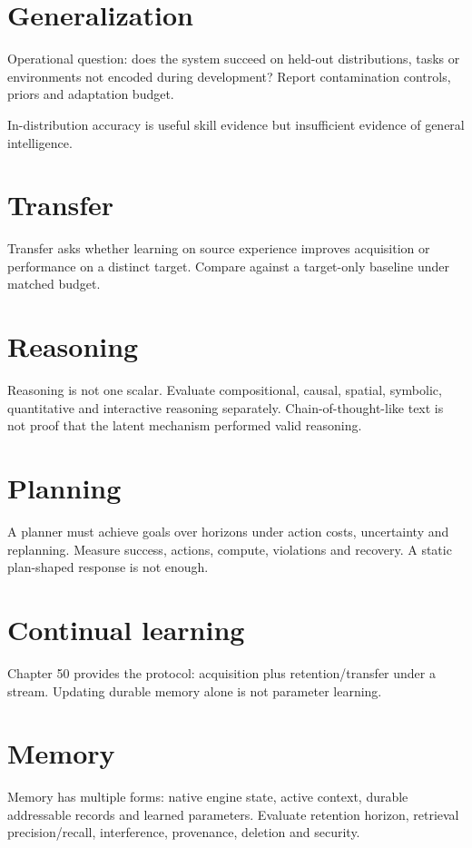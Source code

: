 \section{Generalization}
Operational question: does the system succeed on held-out distributions, tasks or environments not encoded during development? Report contamination controls, priors and adaptation budget.

In-distribution accuracy is useful skill evidence but insufficient evidence of general intelligence.

\section{Transfer}
Transfer asks whether learning on source experience improves acquisition or performance on a distinct target. Compare against a target-only baseline under matched budget.

\section{Reasoning}
Reasoning is not one scalar. Evaluate compositional, causal, spatial, symbolic, quantitative and interactive reasoning separately. Chain-of-thought-like text is not proof that the latent mechanism performed valid reasoning.

\section{Planning}
A planner must achieve goals over horizons under action costs, uncertainty and replanning. Measure success, actions, compute, violations and recovery. A static plan-shaped response is not enough.

\section{Continual learning}
Chapter 50 provides the protocol: acquisition plus retention/transfer under a stream. Updating durable memory alone is not parameter learning.

\section{Memory}
Memory has multiple forms: native engine state, active context, durable addressable records and learned parameters. Evaluate retention horizon, retrieval precision/recall, interference, provenance, deletion and security.

